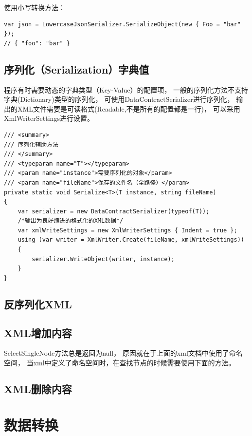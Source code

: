 \documentclass{book}
\begin{document}
使用小写转换方法：

\begin{lstlisting}[language={[Sharp]C},caption=转换实例]
var json = LowercaseJsonSerializer.SerializeObject(new { Foo = "bar" });
// { "foo": "bar" }
\end{lstlisting}

\subsection{序列化（Serialization）字典值}

程序有时需要动态的字典类型（Key-Value）的配置项，
一般的序列化方法不支持字典(Dictionary)类型的序列化，
可使用DataContractSerializer进行序列化，
输出的XML文件需要是可读格式(Readable,不是所有的配置都是一行)，
可以采用XmlWriterSettings进行设置。

\begin{lstlisting}[language={[Sharp]C},caption=将字典序列化为XML文件]
/// <summary>
/// 序列化辅助方法
/// </summary>
/// <typeparam name="T"></typeparam>
/// <param name="instance">需要序列化的对象</param>
/// <param name="fileName">保存的文件名（全路径）</param>
private static void Serialize<T>(T instance, string fileName)
{
    var serializer = new DataContractSerializer(typeof(T));
    /*输出为良好缩进的格式化的XML数据*/
    var xmlWriteSettings = new XmlWriterSettings { Indent = true };
    using (var writer = XmlWriter.Create(fileName, xmlWriteSettings))
    {
        serializer.WriteObject(writer, instance);
    }
}
\end{lstlisting}

\subsection{反序列化XML}

\subsection{XML增加内容}

SelectSingleNode方法总是返回为null，
原因就在于上面的xml文档中使用了命名空间，
当xml中定义了命名空间时，在查找节点的时候需要使用下面的方法。



\subsection{XML删除内容}


\section{数据转换}
\end{document}
